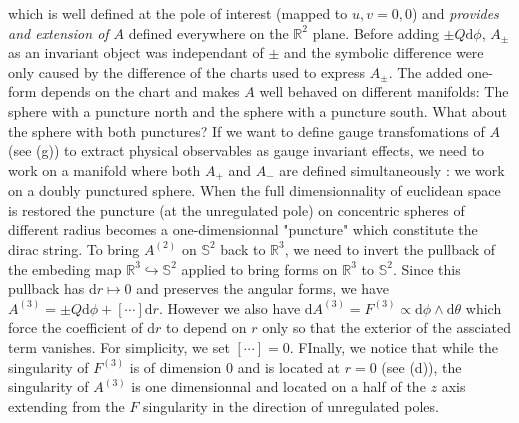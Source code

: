 \documentclass[10pt, a4paper]{article}
\begin{document}
{\begin{enumerate}
  which is well defined at the pole of interest (mapped to $u, v = 0, 0$) and \textit{provides and extension of $A$} defined everywhere on the $\mathbb{R}^2$ plane. Before adding $\pm Q\text{d}\phi$, $A_{\pm}$ as an invariant object was independant of $\pm$ and the symbolic difference were only caused by the difference of the charts used to express $A_\pm$. The added one-form depends on the chart and makes $A$ well behaved on different manifolds: The sphere with a puncture north and the sphere with a puncture south. What about the sphere with both punctures? If we want to define gauge transfomations of $A$ (see (g)) to extract physical observables as gauge invariant effects, we need to work on a manifold where both $A_+$ and $A_-$ are defined simultaneously : we work on a doubly punctured sphere. When the full dimensionnality of euclidean space is restored the puncture (at the unregulated pole) on concentric spheres of different radius becomes a one-dimensionnal "puncture" which constitute the dirac string. To bring $A^{(2)}$ on $\mathbb{S}^2$ back to $\mathbb{R}^3$, we need  to invert the pullback of the embeding map $\mathbb{R}^3 \hookrightarrow \mathbb{S}^2$ applied to bring forms on $\mathbb{R}^3$ to $\mathbb{S}^2$. Since this pullback has $\text{d}r \mapsto 0$ and preserves the angular forms, we have $A^{(3)} = \pm Q\text{d}\phi + [\cdots]\text{d}r$. However we also have $\text{d}A^{(3)} = F^{(3)} \propto \text{d}\phi \wedge \text{d}\theta$ which force the coefficient of $\text{d}r$ to depend on $r$ only so that the exterior of the assciated term vanishes. For simplicity, we set $[\cdots] = 0$. FInally, we notice that while the singularity of $F^{(3)}$ is of dimension $0$ and is located at $r=0$ (see (d)), the singularity of $A^{(3)}$ is one dimensionnal and located on a half of the $z$ axis extending from the $F$ singularity in the direction of unregulated poles. 
  

\end{enumerate}}
\end{document}
